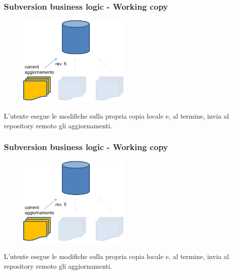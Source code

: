 \documentclass[10pt]{beamer}
\begin{document}
\begin{frame}[fragile]
\frametitle{Subversion business logic - Working copy}
\begin{figure}[h]
 \centering
 \includegraphics[width=0.5\textwidth]{images/svn-step2.png}
\end{figure}
L’utente esegue le modifiche sulla propria copia locale e, al termine, invia al repository remoto gli aggiornamenti.
\end{frame}

\begin{frame}[fragile]
\frametitle{Subversion business logic - Working copy}
\begin{figure}[h]
 \centering
 \includegraphics[width=0.5\textwidth]{images/svn-step2.png}
\end{figure}
L’utente esegue le modifiche sulla propria copia locale e, al termine, invia al repository remoto gli aggiornamenti.
\end{frame}
\end{document}
